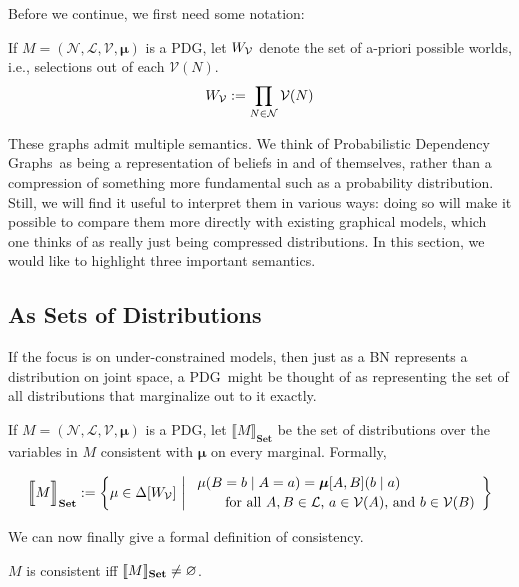 \documentclass{article}
\newcommand\changeon{\color{note-fg} }
\newcommand\changeoff{\color{black} }
\newcommand{\modelnames}{Probabilistic Dependency Graphs}
\newcommand{\MN}{PDG}%
\newcommand\Set{\textbf{Set}}
\newcommand\bmu{\boldsymbol{\mu}}
\begin{document}
	\changeon
	Before we continue, we first need some notation:
	\begin{defn}
		If $M = (\mathcal N, \mathcal L, \mathcal V, \bmu)$ is a \MN, let $W_{\cal V}$  denote the set of a-priori possible worlds, i.e., selections out of each $\mathcal V(N)$.
		\[ W_{\cal V} := \prod_{N \in \mathcal N}\mathcal V(N) \]
	\end{defn}
	\changeoff
			
	These graphs admit multiple semantics. We think of \modelnames\ as being a representation of beliefs in and of themselves, rather than a compression of something more fundamental such as a probability distribution. Still, we will find it useful to interpret them in various ways: doing so will make it possible to compare them more directly with existing graphical models, which one thinks of as really just being compressed distributions. In this section, we would like to highlight three important semantics.
	
	\subsection{As Sets of Distributions}\label{sec:set-of-distribution-semantics}
	If the focus is on under-constrained models, then just as a BN represents a distribution on joint space, a \MN\ might be thought of as representing the set of all distributions that marginalize out to it exactly. 
	

	
	\begin{defn}
		If $M = (\mathcal N, \mathcal L, \mathcal V, \boldsymbol\mu)$ is a \MN, let $\llbracket M \rrbracket_\Set$ be the set of distributions over the variables in $M$ consistent with $\boldsymbol\mu$ on every marginal. Formally,
		
		\[ \Big\llbracket M \Big\rrbracket_\Set := \left\{\mu \in \Delta[W_{\cal V}] ~\middle|~
		\begin{array}{l}
		\mu(B = b \mid A = a) = \boldsymbol\mu[A,B](b \mid a) \\[0.2em]
		\qquad\text{for all $A, B \in \mathcal L$, $a \in\mathcal V(A)$, and $b \in \mathcal V(B)$} \end{array} \right\}\]
	\end{defn}	

	\changeon
	We can now finally give a formal definition of consistency.
	\begin{defn} \label{def:weak-consistent}
		$M$ is consistent iff $\bbr{M}_\Set \neq \varnothing$.
	\end{defn}
	
\end{document}
